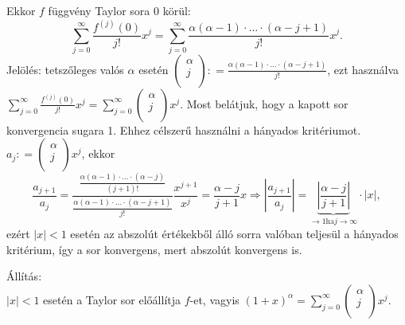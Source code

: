 \documentclass[12pt,a4paper]{scrartcl}
\newenvironment{allitas}{}{}
\begin{document}
Ekkor \(f\) függvény Taylor sora 0 körül:
\[\mathop \sum \limits_{j = 0}^\infty  \frac{{{f^{\left( j \right)}}\left( 0 \right)}}{{j!}}{x^j} = \mathop \sum \limits_{j = 0}^\infty  \frac{{\alpha \left( {\alpha  - 1} \right) \cdot  \ldots  \cdot \left( {\alpha  - j + 1} \right)}}{{j!}}{x^j}.\]
Jelölés: tetszőleges valós \(\alpha\) esetén
\(\begin{pmatrix} \alpha \\ j \\ \end{pmatrix}: = \frac{\alpha\left( {\alpha - 1} \right) \cdot \ldots \cdot \left( {\alpha - j + 1} \right)}{j!}\),
ezt használva
\({\sum\limits_{j = 0}^{\infty}\frac{f^{(j)}\left( 0 \right)}{j!}}x^{j} = {\sum\limits_{j = 0}^{\infty}{\begin{pmatrix} \alpha \\ j \\ \end{pmatrix}x^{j}}}\).
Most belátjuk, hogy a kapott sor konvergencia sugara 1. Ehhez célszerű
használni a hányados kritériumot.
\(a_{j}: = \begin{pmatrix} \alpha \\ j \\ \end{pmatrix}x^{j}\), ekkor
\[\frac{{{a_{j + 1}}}}{{{a_j}}} = \frac{{\frac{{\alpha (\alpha  - 1)\cdot \ldots \cdot(\alpha  - j)}}{{(j + 1)!}}}}{{\frac{{\alpha (\alpha  - 1)\cdot \ldots \cdot(\alpha  - j + 1)}}{{j!}}}}\frac{{{x^{j + 1}}}}{{{x^j}}} = \frac{{\alpha  - j}}{{j + 1}}x \Rightarrow \left| {\frac{{{a_{j + 1}}}}{{{a_j}}}} \right| = \underbrace {\left| {\frac{{\alpha  - j}}{{j + 1}}} \right|}_{ \to 1{\text{ha}}j \to \infty }\cdot\left| x \right|,\]
ezért \(\left| x \right| < 1\) esetén az abszolút értékekből álló sorra
valóban teljesül a hányados kritérium, így a sor konvergens, mert
abszolút konvergens is.

\begin{allitas}

Állítás:\\
\(\left| x \right| < 1\) esetén a Taylor sor előállítja \(f\)-et, vagyis
\(\left( {1 + x} \right)^{\alpha} = {\sum\limits_{j = 0}^{\infty}{\begin{pmatrix} \alpha \\ j \\ \end{pmatrix}x^{j}}}\).

\end{allitas}
\end{document}
